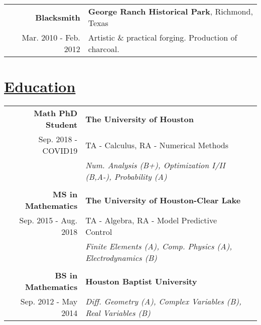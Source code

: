 \documentclass[10pt]{article}   %
\begin{document}
\begin{tabular}{ r | l }
\bf Blacksmith                  &\textbf{George Ranch Historical Park}, Richmond, Texas\\
Mar. 2010 - Feb. 2012           &Artistic \& practical forging. Production of charcoal.\\
\end{tabular}

\section*{\underline{Education}}

\begin{tabular}{ r | l l }
\bf Math PhD Student          &\bf The University of Houston\\
Sep. 2018 - COVID19           &TA - Calculus, RA - Numerical Methods\\
                                &\textit{Num. Analysis (B+), Optimization I/II (B,A-), Probability (A)}\\
\\
\bf MS in Mathematics           &\bf The University of Houston-Clear Lake\\
Sep. 2015 - Aug. 2018           &TA - Algebra, RA - Model Predictive Control\\
                                &\textit{Finite Elements (A), Comp. Physics (A), Electrodynamics (B)}\\
\\
\bf BS in Mathematics           &\bf Houston Baptist University\\
Sep. 2012 - May 2014            &\textit{Diff. Geometry (A), Complex Variables (B), Real Variables (B)}
\end{tabular}
\end{document}
